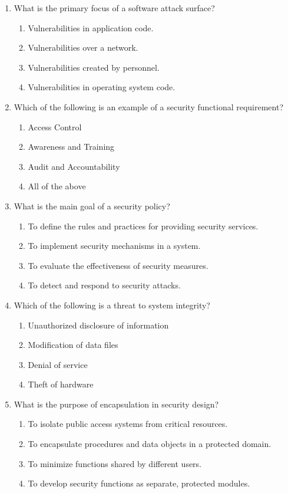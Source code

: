 \documentclass{article}
\begin{document}
\begin{enumerate}
    \item What is the primary focus of a software attack surface?
    \begin{enumerate}
        \item Vulnerabilities in application code.
        \item Vulnerabilities over a network.
        \item Vulnerabilities created by personnel.
        \item Vulnerabilities in operating system code.
    \end{enumerate}
    
    \item Which of the following is an example of a security functional requirement?
    \begin{enumerate}
        \item Access Control
        \item Awareness and Training
        \item Audit and Accountability
        \item All of the above
    \end{enumerate}
    
    \item What is the main goal of a security policy?
    \begin{enumerate}
        \item To define the rules and practices for providing security services.
        \item To implement security mechanisms in a system.
        \item To evaluate the effectiveness of security measures.
        \item To detect and respond to security attacks.
    \end{enumerate}
    
    \item Which of the following is a threat to system integrity?
    \begin{enumerate}
        \item Unauthorized disclosure of information
        \item Modification of data files
        \item Denial of service
        \item Theft of hardware
    \end{enumerate}
    \newpage
    \item What is the purpose of encapsulation in security design?
    \begin{enumerate}
        \item To isolate public access systems from critical resources.
        \item To encapsulate procedures and data objects in a protected domain.
        \item To minimize functions shared by different users.
        \item To develop security functions as separate, protected modules.
    \end{enumerate}
    

\end{enumerate}
\end{document}
